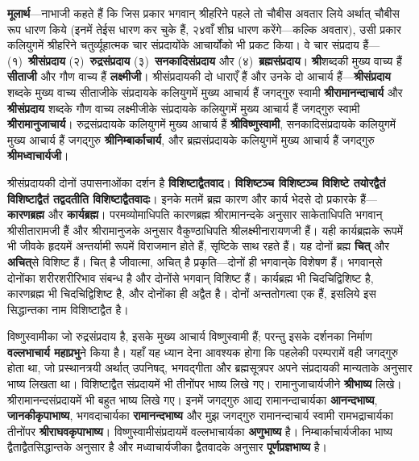 \begin{sloppypar}\justifying{}
\textbf{मूलार्थ}—नाभाजी कहते हैं कि जिस प्रकार भगवान् श्रीहरिने पहले तो चौबीस अवतार लिये अर्थात् चौबीस रूप धारण किये (इनमें तेईस धारण कर चुके हैं, २४वाँ शीघ्र धारण करेंगे—कल्कि अवतार), उसी प्रकार कलियुगमें श्रीहरिने चतुर्व्यूहात्मक चार संप्रदायोंके आचार्योंको भी प्रकट किया। वे चार संप्रदाय हैं—(१)~\textbf{श्रीसंप्रदाय} (२)~\textbf{रुद्रसंप्रदाय} (३)~\textbf{सनकादिसंप्रदाय} और (४)~\textbf{ब्रह्मसंप्रदाय}। \textbf{श्री}शब्दकी मुख्य वाच्य हैं \textbf{सीताजी} और गौण वाच्य हैं \textbf{लक्ष्मीजी}। श्रीसंप्रदायकी दो धाराएँ हैं और उनके दो आचार्य हैं—\textbf{श्रीसंप्रदाय} शब्दके मुख्य वाच्य सीताजीके संप्रदायके कलियुगमें मुख्य आचार्य हैं जगद्गुरु स्वामी \textbf{श्रीरामानन्दाचार्य} और \textbf{श्रीसंप्रदाय} शब्दके गौण वाच्य लक्ष्मीजीके संप्रदायके कलियुगमें मुख्य आचार्य हैं जगद्गुरु स्वामी \textbf{श्रीरामानुजाचार्य}। रुद्रसंप्रदायके कलियुगमें मुख्य आचार्य हैं \textbf{श्रीविष्णुस्वामी}, सनकादिसंप्रदायके कलियुगमें मुख्य आचार्य हैं जगद्गुरु \textbf{श्रीनिम्बार्काचार्य}, और ब्रह्मसंप्रदायके कलियुगमें मुख्य आचार्य हैं जगद्गुरु \textbf{श्रीमध्वाचार्यजी}।
\end{sloppypar}
\begin{sloppypar}\justifying{}
श्रीसंप्रदायकी दोनों उपासनाओंका दर्शन है \textbf{विशिष्टाद्वैत\-वाद}। \textbf{विशिष्टञ्च विशिष्टञ्च विशिष्टे तयोरद्वैतं विशिष्टाद्वैतं तद्वदतीति विशिष्टाद्वैतवादः}। इनके मतमें ब्रह्म कारण और कार्य भेदसे दो प्रकारके हैं—\textbf{कारण\-ब्रह्म} और \textbf{कार्य\-ब्रह्म}। परम\-व्योमाधिपति कारण\-ब्रह्म श्रीरामानन्दके अनुसार साकेताधिपति भगवान् श्रीसीता\-रामजी हैं और श्रीरामानुजके अनुसार वैकुण्ठाधि\-पति श्रीलक्ष्मी\-नारायणजी हैं। यही कार्य\-ब्रह्मके रूपमें भी जीवके हृदयमें अन्तर्यामी रूपमें विराजमान होते हैं, सृष्टिके साथ रहते हैं। यह दोनों ब्रह्म \textbf{चित्} और \textbf{अचित्‌}से विशिष्ट हैं। चित् है जीवात्मा, अचित् है प्रकृति—दोनों ही भगवान्‌के विशेषण हैं। भगवान्‌से दोनोंका शरीर\-शरीरि\-भाव संबन्ध है और दोनोंसे भगवान् विशिष्ट हैं। कार्यब्रह्म भी चिदचिद्विशिष्ट है, कारणब्रह्म भी चिदचिद्विशिष्ट है, और दोनोंका ही अद्वैत है। दोनों अन्ततोगत्वा एक हैं, इसलिये इस सिद्धान्तका नाम विशिष्टाद्वैत है।
\end{sloppypar}
\begin{sloppypar}\justifying{}
विष्णु\-स्वामीका जो रुद्रसंप्रदाय है, इसके मुख्य आचार्य विष्णु\-स्वामी हैं; परन्तु इसके दर्शनका निर्माण \textbf{वल्लभाचार्य महाप्रभु}ने किया है। यहाँ यह ध्यान देना आवश्यक होगा कि पहलेकी परम्परामें वही जगद्गुरु होता था, जो प्रस्थानत्रयी अर्थात् उपनिषद्, भगवद्गीता और ब्रह्मसूत्रपर अपने संप्रदायकी मान्यताके अनुसार भाष्य लिखता था। विशिष्टाद्वैत संप्रदायमें भी तीनोंपर भाष्य लिखे गए। रामानुजाचार्यजीने \textbf{श्रीभाष्य} लिखे। श्रीरामानन्द\-संप्रदायमें भी बहुत भाष्य लिखे गए। इनमें जगद्गुरु आद्य रामानन्दाचार्यका \textbf{आनन्दभाष्य}, \textbf{जानकी\-कृपाभाष्य}, भगवदाचार्यका \textbf{रामानन्दभाष्य} और मुझ जगद्गुरु रामानन्दाचार्य स्वामी रामभद्राचार्यका तीनोंपर \textbf{श्रीराघव\-कृपाभाष्य}। विष्णुस्वामी\-संप्रदायमें वल्लभाचार्यका \textbf{अणुभाष्य} है। निम्बार्काचार्यजीका भाष्य द्वैताद्वैत\-सिद्धान्तके अनुसार है और मध्वाचार्यजीका द्वैतवादके अनुसार \textbf{पूर्णप्रज्ञभाष्य} है।
\end{sloppypar}
